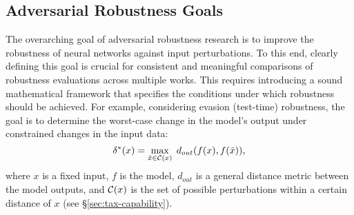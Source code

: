 \subsection{Adversarial Robustness Goals}\label{sec:tax-goals}%
The overarching goal of adversarial robustness research is to improve the robustness of neural networks against input perturbations. To this end, clearly defining this goal is crucial for consistent and meaningful comparisons of robustness evaluations across multiple works. 
This requires introducing a sound mathematical framework that specifies the conditions under which robustness should be achieved. %
%
For example, considering evasion (test-time) robustness, the goal is to determine the worst-case change in the model's output under constrained changes in the input data:
\begin{equation}\label{eq:adv-goal-evasion}
    \delta^*(x) = \max_{\tilde{x} \in {\mathcal{C}}(x)} \; d_{out} (f(x), f(\tilde{x})), 
\end{equation}
where $x$ is a fixed input, $f$ is the model, $d_{out}$ is a general distance metric between the model outputs, and ${\mathcal{C}}(x)$ is the set of possible perturbations within a certain distance of $x$ (see \S\ref{sec:tax-capability}). %
%
%
